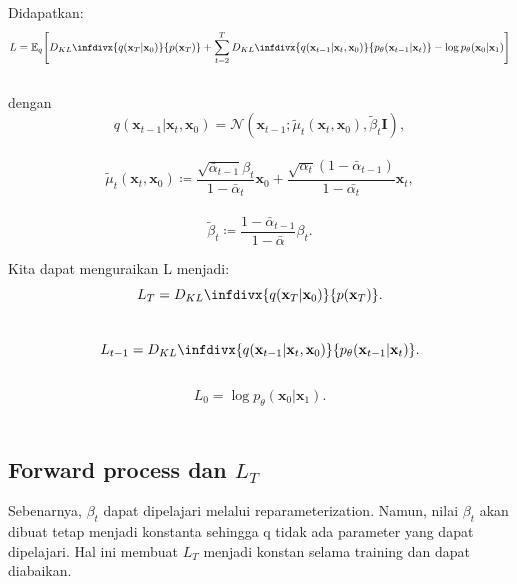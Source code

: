 \documentclass{article}
\newcommand{\infdiv}{D_{KL}\infdivx}
\begin{document}
Didapatkan:
\\
\begin{equation}
{\small L = 
\mathbb{E}_{q} \left[ 
\infdiv{q(\textbf{x}_T|\textbf{x}_0)}{p(\textbf{x}_T)}
+ 
\sum_{t=2}^{T} \infdiv{ 
q(\textbf{x}_{t-1}|\textbf{x}_t,\textbf{x}_0)
}
{
p_\theta(\textbf{x}_{t-1}|\textbf{x}_{t})
}
-
\log p_\theta(\textbf{x}_0|\textbf{x}_1)
\right]
}
\end{equation}
\\
dengan 
\begin{equation}
q(\textbf{x}_{t-1}|\textbf{x}_t,\textbf{x}_0) = \mathscr{N}(\textbf{x}_{t-1};\tilde{\mu}_t(\textbf{x}_{t},\textbf{x}_0),\tilde{\beta}_t\textbf{I}), 
\end{equation}
\\
\begin{equation}
\tilde{\mu}_t(\textbf{x}_{t},\textbf{x}_0) \coloneq \frac{
\sqrt{\bar{\alpha}_{t-1}}\beta_t
}
{
1 - \bar{\alpha}_t
}
\textbf{x}_0 
+
\frac{
\sqrt{\alpha_{t}}(1-\bar{\alpha}_{t-1})
}
{
1 - \bar{\alpha_t}
}
\textbf{x}_t,
\end{equation}
\\
\begin{equation}
\tilde{\beta}_t \coloneq 
\frac{
1-\bar{\alpha}_{t-1}
}
{
1-\bar{\alpha}
}
\beta_t.
\end{equation}

Kita dapat menguraikan L menjadi:
\\
\begin{equation}
L_T = 
\infdiv{q(\textbf{x}_T|\textbf{x}_0)}{p(\textbf{x}_T)}.
\end{equation}
\\
\begin{equation}
L_{t-1} = 
\infdiv{ 
q(\textbf{x}_{t-1}|\textbf{x}_t,\textbf{x}_0)
}
{
p_\theta(\textbf{x}_{t-1}|\textbf{x}_{t})
}.
\end{equation}
\\
\begin{equation}
L_{0} = 
\log p_\theta(\textbf{x}_0|\textbf{x}_1).
\end{equation}
\\


\subsection{Forward process dan $ L_T $}
Sebenarnya, $ \beta_t $ dapat dipelajari melalui reparameterization. Namun, nilai $ \beta_t $ akan dibuat tetap menjadi konstanta sehingga q tidak ada parameter yang dapat dipelajari. Hal ini membuat $ L_T $ menjadi konstan selama training dan dapat diabaikan.
\end{document}
